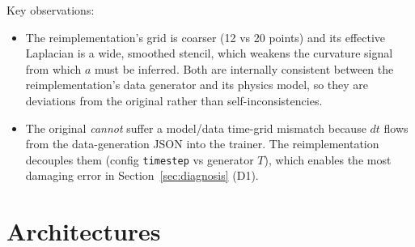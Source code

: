 \documentclass[11pt,a4paper]{article}
\newcommand{\code}[1]{\texttt{#1}}
\begin{document}
\noindent Key observations:
\begin{itemize}[nosep]
  \item The reimplementation's grid is coarser (12 vs 20 points) and its effective
        Laplacian is a wide, smoothed stencil, which weakens the curvature signal from
        which $a$ must be inferred. Both are internally consistent between the
        reimplementation's data generator and its physics model, so they are deviations
        from the original rather than self-inconsistencies.
  \item The original \emph{cannot} suffer a model/data time-grid mismatch because
        $dt$ flows from the data-generation JSON into the trainer. The reimplementation
        decouples them (config \code{timestep} vs generator $T$), which enables the
        most damaging error in Section~\ref{sec:diagnosis} (D1).
\end{itemize}

\section{Architectures}
\label{sec:arch}
\end{document}
